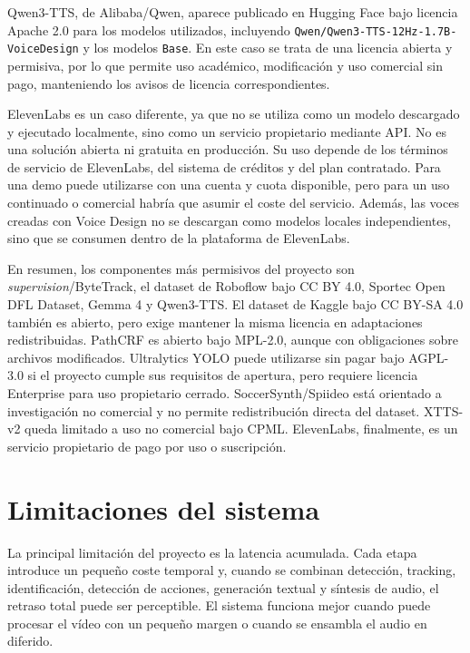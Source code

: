 Qwen3-TTS, de Alibaba/Qwen, aparece publicado en Hugging Face bajo licencia Apache 2.0 para los modelos utilizados, incluyendo \texttt{Qwen/Qwen3-TTS-12Hz-1.7B-VoiceDesign} y los modelos \texttt{Base}. En este caso se trata de una licencia abierta y permisiva, por lo que permite uso académico, modificación y uso comercial sin pago, manteniendo los avisos de licencia correspondientes.

ElevenLabs es un caso diferente, ya que no se utiliza como un modelo descargado y ejecutado localmente, sino como un servicio propietario mediante API. No es una solución abierta ni gratuita en producción. Su uso depende de los términos de servicio de ElevenLabs, del sistema de créditos y del plan contratado. Para una demo puede utilizarse con una cuenta y cuota disponible, pero para un uso continuado o comercial habría que asumir el coste del servicio. Además, las voces creadas con Voice Design no se descargan como modelos locales independientes, sino que se consumen dentro de la plataforma de ElevenLabs.

En resumen, los componentes más permisivos del proyecto son \textit{supervision}/ByteTrack, el dataset de Roboflow bajo CC BY 4.0, Sportec Open DFL Dataset, Gemma 4 y Qwen3-TTS. El dataset de Kaggle bajo CC BY-SA 4.0 también es abierto, pero exige mantener la misma licencia en adaptaciones redistribuidas. PathCRF es abierto bajo MPL-2.0, aunque con obligaciones sobre archivos modificados. Ultralytics YOLO puede utilizarse sin pagar bajo AGPL-3.0 si el proyecto cumple sus requisitos de apertura, pero requiere licencia Enterprise para uso propietario cerrado. SoccerSynth/Spiideo está orientado a investigación no comercial y no permite redistribución directa del dataset. XTTS-v2 queda limitado a uso no comercial bajo CPML. ElevenLabs, finalmente, es un servicio propietario de pago por uso o suscripción.

\section{Limitaciones del sistema}

La principal limitación del proyecto es la latencia acumulada. Cada etapa introduce un pequeño coste temporal y, cuando se combinan detección, tracking, identificación, detección de acciones, generación textual y síntesis de audio, el retraso total puede ser perceptible. El sistema funciona mejor cuando puede procesar el vídeo con un pequeño margen o cuando se ensambla el audio en diferido.


